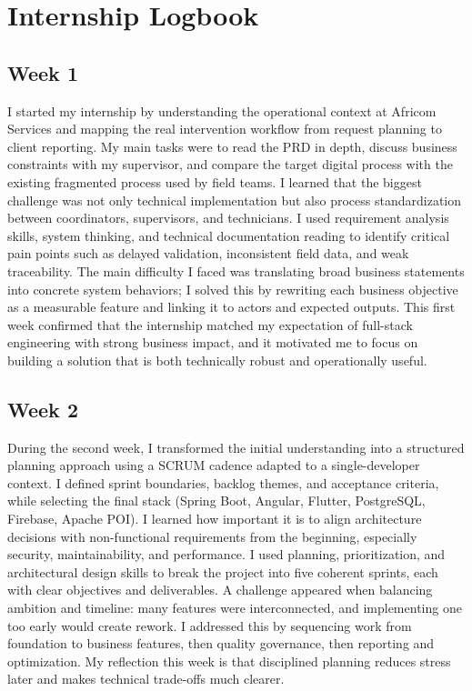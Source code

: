 \chapter*{Internship Logbook}

\section*{Week 1}
I started my internship by understanding the operational context at Africom Services and mapping the real intervention workflow from request planning to client reporting. My main tasks were to read the PRD in depth, discuss business constraints with my supervisor, and compare the target digital process with the existing fragmented process used by field teams. I learned that the biggest challenge was not only technical implementation but also process standardization between coordinators, supervisors, and technicians. I used requirement analysis skills, system thinking, and technical documentation reading to identify critical pain points such as delayed validation, inconsistent field data, and weak traceability. The main difficulty I faced was translating broad business statements into concrete system behaviors; I solved this by rewriting each business objective as a measurable feature and linking it to actors and expected outputs. This first week confirmed that the internship matched my expectation of full-stack engineering with strong business impact, and it motivated me to focus on building a solution that is both technically robust and operationally useful.

\section*{Week 2}
During the second week, I transformed the initial understanding into a structured planning approach using a SCRUM cadence adapted to a single-developer context. I defined sprint boundaries, backlog themes, and acceptance criteria, while selecting the final stack (Spring Boot, Angular, Flutter, PostgreSQL, Firebase, Apache POI). I learned how important it is to align architecture decisions with non-functional requirements from the beginning, especially security, maintainability, and performance. I used planning, prioritization, and architectural design skills to break the project into five coherent sprints, each with clear objectives and deliverables. A challenge appeared when balancing ambition and timeline: many features were interconnected, and implementing one too early would create rework. I addressed this by sequencing work from foundation to business features, then quality governance, then reporting and optimization. My reflection this week is that disciplined planning reduces stress later and makes technical trade-offs much clearer.

